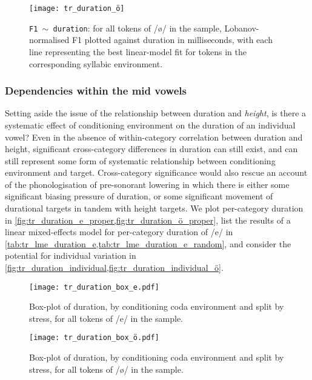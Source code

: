 \begin{figure}[H]
  \centering
  \texttt{[image: tr\_duration\_ö]}
  \caption[\texttt{F1 $\sim$ duration} correlation for /ø/, split by environment.]{\texttt{F1 $\sim$ duration}: for all tokens of /ø/ in the sample, Lobanov-normalised F1 plotted against duration in milliseconds, with each line representing the best linear-model fit for tokens in the corresponding syllabic environment.}
  \label{fig:trdurationö}
\end{figure}

\subsubsection{Dependencies within the mid vowels} Setting aside the issue of the relationship between duration and \emph{height}, is there a systematic effect of conditioning environment on the duration of an individual vowel? Even in the absence of within-category correlation between duration and height, significant cross-category differences in duration can still exist, and can still represent some form of systematic relationship between conditioning environment and target. Cross-category significance would also rescue an account of the phonologisation of pre-sonorant lowering in which there is either some significant biasing pressure of duration, or some significant movement of durational targets in tandem with height targets. We plot per-category duration in \cref{fig:tr_duration_e_proper,fig:tr_duration_ö_proper}, list the results of a linear mixed-effects model for per-category duration of /e/ in \cref{tab:tr_lme_duration_e,tab:tr_lme_duration_e_random}, and consider the potential for individual variation in \cref{fig:tr_duration_individual,fig:tr_duration_individual_ö}.

\begin{figure}[H]
  \texttt{[image: tr\_duration\_box\_e.pdf]}
  \caption[Duration by conditioning category for /e/.]{Box-plot of duration, by conditioning coda environment and split by stress, for all tokens of /e/ in the sample.}
  \label{fig:tr_duration_e_proper}
\end{figure}

\begin{figure}[H]
  \texttt{[image: tr\_duration\_box\_ö.pdf]}
  \caption[Duration by conditioning category for /ø/.]{Box-plot of duration, by conditioning coda environment and split by stress, for all tokens of /ø/ in the sample.}
  \label{fig:tr_duration_ö_proper}
\end{figure}

